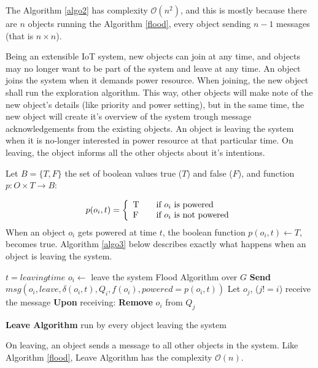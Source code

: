 \documentclass[letterpaper, 10 pt, conference]{ieeeconf}
\begin{document}
The Algorithm \ref{algo2} has complexity $\mathcal{O}(n^2)$, and this is mostly because there are $n$ objects running the Algorithm \ref{flood}, every object sending $n-1$ messages (that is $n\times n$).

Being an extensible IoT system, new objects can join at any time, and objects may no longer want to be part of the system and leave at any time. An object joins the system when it demands power resource. When joining, the new object shall run the exploration algorithm. This way, other objects will make note of the new object's details (like priority and power setting), but in the same time, the new object will create it's overview of the system trough message acknowledgements from the existing objects. An object is leaving the system when it is no-longer interested in power resource at that particular time. On leaving, the object informs all the other objects about it's intentions.

Let $B = \{T,F\}$ the set of boolean values true ($T$) and false ($F$), and function $p:O\times T \rightarrow B$:

  \[ p(o_{i}, t)= \left\{
  \begin{array}{l l}
    $T$ & \quad \textrm{if $o_{i}$ is powered}\\
    $F$ & \quad \textrm{if $o_{i}$ is not powered}
  \end{array} \right.\]
When an object $o_{i}$ gets powered at time $t$, the boolean function $p(o_{i},t) \gets T$, becomes true. Algorithm \ref{algo3} below describes exactly what happens when an object is leaving the system.


\LinesNumbered
\IncMargin{1em}
\begin{algorithm}
$t = leaving time$
\BlankLine
$o_{i} \gets$ leave the system \newline
Flood Algorithm over $G$ \newline
\textbf{Send} $msg(o_{i}, leave,\delta(o_{i}, t), Q_{i}, f(o_{i}), powered=p(o_{i},t))$
\BlankLine
{} {
    Let $o_{j}$, ($j!=i$) receive the message
    \BlankLine
    \textbf{Upon} receiving:\newline
     {
          \textbf{Remove} $o_{i}$ from $Q_{j}$
    }
}
\caption{\textbf{Leave Algorithm} run by every object leaving the system} \label{algo3}
\end{algorithm}
\DecMargin{1em}
On leaving, an object sends a message to all other objects in the system. Like Algorithm \ref{flood}, Leave Algorithm has the complexity $\mathcal{O}(n)$.
\end{document}
